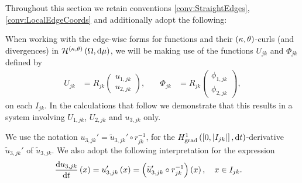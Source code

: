 Throughout this section we retain conventions \ref{conv:StraightEdges}, \ref{conv:LocalEdgeCoords} and additionally adopt the following:
\begin{convention} \label{conv:RotatedComponents}
	When working with the edge-wise forms for functions and their $\left( \kappa, \theta \right)$-curls (and divergences) in $\mathcal{H}^{\left( \kappa, \theta \right)}\left( \Omega, \mathrm{d}\mu \right)$, we will be making use of the functions $U_{jk}$ and $\Phi_{jk}$ defined by
	\begin{align*}
		U_{jk} &= R_{jk}\begin{pmatrix} u_{1,jk} \\ u_{2,jk} \end{pmatrix}, 
		&\quad
		\Phi_{jk} &= R_{jk}\begin{pmatrix} \phi_{1,jk} \\ \phi_{2,jk} \end{pmatrix},
	\end{align*}
	on each $I_{jk}$.
	In the calculations that follow we demonstrate that this results in a system involving $U_{1,jk}$, $U_{2,jk}$ and $u_{3,jk}$ only.
\end{convention}
\begin{convention} \label{conv:DerivLikeNotation}
	We use the notation $u_{3,jk}' = \widetilde{u}_{3,jk}' \circ r_{jk}^{-1}$, for the $H^1_\mathrm{grad}\left( \left[ 0,\left\lvert I_{jk} \right\rvert \right], \mathrm{d}t \right)$-derivative $\widetilde{u}_{3,jk}'$ of $\widetilde{u}_{3,jk}$.
	We also adopt the following interpretation for the expression
	\begin{align*}
		\dfrac{\mathrm{d}u_{3,jk}}{\mathrm{d}t}\left( x \right) &= u_{3,jk}'\left( x \right) = \left( \widetilde{u}_{3,jk}' \circ r_{jk}^{-1} \right)\left( x \right), \quad x\in I_{jk}.
	\end{align*}
\end{convention} 

